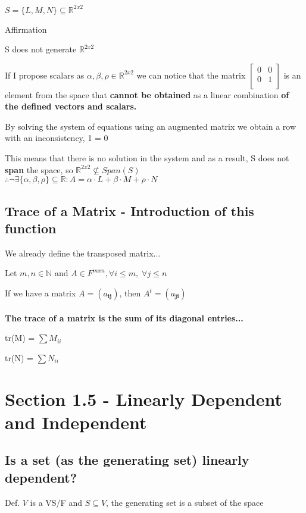 \documentclass{article}
\begin{document}
\(S = \{L, M ,N\} \subseteq \mathbb{R}^{2x2}\)

Affirmation 

S does not generate \(\mathbb{R}^{2x2}\)

If I propose scalars as \(\alpha, \beta, \rho \in \mathbb{R}^{2x2}\) we can notice that the matrix \(\begin{bmatrix}
    0&0\\
    0&1\\
\end{bmatrix}\) is an element from the space that \textbf{cannot be obtained }as a linear combination \textbf{of the defined vectors and scalars.}

By solving the system of equations using an augmented matrix we obtain a row with an inconsistency, 1 = 0

This means that there is no solution in the system and as a result, S does not \textbf{span} the space, so \(\mathbb{R}^{2x2} \nsubseteq Span(S)\)
\\

\(\therefore \neg \exists \{\alpha, \beta, \rho\} \subseteq \mathbb{R} : A = \alpha \cdot L + \beta \cdot M + \rho \cdot N \)

\subsection*{Trace of a Matrix - Introduction of this function}
We already define the transposed matrix...

Let \(m, n \in \mathbb{N}\) and \(A \in F^{mxn}, \forall i \leq m,\; \forall j \leq n\)

If we have a matrix \(A = (a_{\textbf{ij}})\), then \(A^t = (a_{\textbf{ji}})\)
\\\\
\textbf{The trace of a matrix is the sum of its diagonal entries...}

tr(M) = \(\sum M_{ii}\)

tr(N) = \(\sum N_{ii}\)

\section*{Section 1.5 - Linearly Dependent and Independent}
\subsection*{Is a set (as the generating set) linearly dependent?}
Def. \(V\) is a VS/F and \(S \subseteq V\), the generating set is a subset of the space
\end{document}
